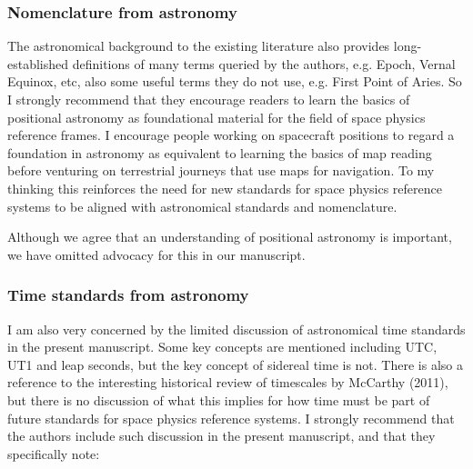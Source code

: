\documentclass[11pt]{article}
\begin{document}
\subsubsection{Nomenclature from astronomy}
The astronomical background to the existing literature also provides long-established definitions of many
terms queried by the authors, e.g. Epoch, Vernal Equinox, etc, also some useful terms they do not use, e.g.
First Point of Aries. So I strongly recommend that they encourage readers to learn the basics of positional
astronomy as foundational material for the field of space physics reference frames. I encourage people
working on spacecraft positions to regard a foundation in astronomy as equivalent to learning the basics of
map reading before venturing on terrestrial journeys that use maps for navigation. To my thinking this
reinforces the need for new standards for space physics reference systems to be aligned with astronomical
standards and nomenclature.
\\
{\color{violet}
\begin{leftbar}
Although we agree that an understanding of positional astronomy is important, we have omitted advocacy for this in our manuscript.
\end{leftbar}
}

\subsubsection{Time standards from astronomy}
I am also very concerned by the limited discussion of astronomical time standards in the present manuscript.
Some key concepts are mentioned including UTC, UT1 and leap seconds, but the key concept of sidereal time
is not. There is also a reference to the interesting historical review of timescales by McCarthy (2011), but
there is no discussion of what this implies for how time must be part of future standards for space physics
reference systems. I strongly recommend that the authors include such discussion in the present manuscript,
and that they specifically note:
\end{document}

